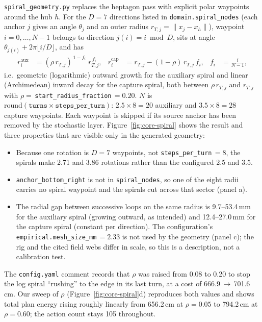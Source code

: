 \texttt{spiral\_geometry.py} replaces the heptagon pass with explicit polar waypoints around the hub $h$.
For the $D=7$ directions listed in \texttt{domain.spiral\_nodes} (each anchor $j$ gives an angle
$\theta_j$ and an outer radius $r_{T,j}=\lVert x_j - x_h\rVert$), waypoint $i=0,\dots,N-1$ belongs to
direction $j(i)=i \bmod D$, sits at angle $\theta_{j(i)} + 2\pi\lfloor i/D\rfloor$, and has
\begin{align}
  r_i^{\mathrm{aux}} &= (\rho\, r_{T,j})^{\,1-f_i}\; r_{T,j}^{\,f_i}, &
  r_i^{\mathrm{cap}} &= r_{T,j} - (1-\rho)\, r_{T,j}\, f_i, &
  f_i &= \frac{i}{N-1}, \label{eq:core-spiral}
\end{align}
i.e.\ geometric (logarithmic) outward growth for the auxiliary spiral and linear (Archimedean) inward decay
for the capture spiral, both between $\rho\,r_{T,j}$ and $r_{T,j}$ with
$\rho=$\,\texttt{start\_radius\_fraction}\,$=0.20$. $N$ is
$\mathrm{round}(\texttt{turns}\times\texttt{steps\_per\_turn})$: $2.5\times 8=20$ auxiliary and
$3.5\times 8=28$ capture waypoints. Each waypoint is skipped if its source anchor has been removed by the
stochastic layer. Figure~\ref{fig:core-spiral} shows the result and three properties that are visible only
in the generated geometry:
\begin{itemize}
  \item Because one rotation is $D=7$ waypoints, not \texttt{steps\_per\_turn}\,$=8$, the spirals make
  2.71 and 3.86 rotations rather than the configured 2.5 and 3.5.
  \item \texttt{anchor\_bottom\_right} is not in \texttt{spiral\_nodes}, so one of the eight radii carries
  no spiral waypoint and the spirals cut across that sector (panel a).
  \item The radial gap between successive loops on the same radius is 9.7--53.4\,mm for the auxiliary
  spiral (growing outward, as intended) and 12.4--27.0\,mm for the capture spiral (constant per direction).
  The configuration's \texttt{empirical.mesh\_size\_mm}\,$=2.33$ is not used by the geometry (panel c);
  the rig and the cited field webs differ in scale, so this is a description, not a calibration test.
\end{itemize}
The \texttt{config.yaml} comment records that $\rho$ was raised from 0.08 to 0.20 to stop the log spiral
``rushing'' to the edge in its last turn, at a cost of 666.9\,$\to$\,701.6\,cm. Our sweep of $\rho$
(Figure~\ref{fig:core-spiral}d) reproduces both values and shows total plan energy rising roughly linearly
from 656.2\,cm at $\rho=0.05$ to 794.2\,cm at $\rho=0.60$; the action count stays 105 throughout.

